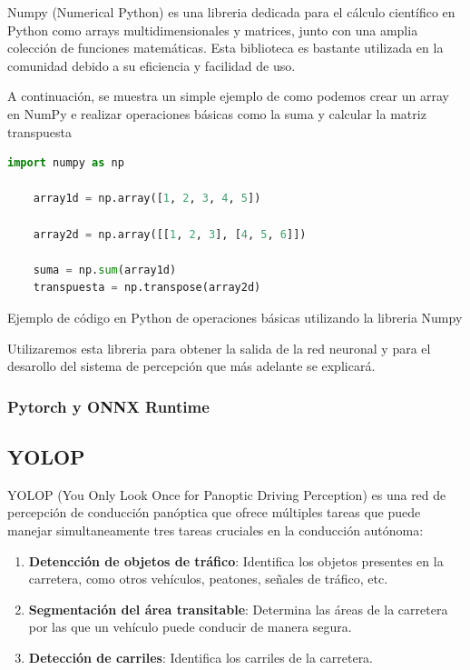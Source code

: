 Numpy (Numerical Python) es una libreria dedicada para el cálculo científico en Python como arrays multidimensionales y matrices, junto con una amplia
colección de funciones matemáticas. Esta biblioteca es bastante utilizada en la comunidad debido a su eficiencia y facilidad de uso. 

A continuación, se muestra un simple ejemplo de como podemos crear un array en NumPy e realizar operaciones básicas como la suma y calcular la matriz transpuesta

\begin{code}[h]
  \begin{lstlisting}[language=Python]
    import numpy as np

    array1d = np.array([1, 2, 3, 4, 5])

    array2d = np.array([[1, 2, 3], [4, 5, 6]])

    suma = np.sum(array1d)  
    transpuesta = np.transpose(array2d)  
  \end{lstlisting}
  \caption[Ejemplo de código en Python de operaciones básicas utilizando la libreria Numpy]{Ejemplo de código en Python de operaciones básicas utilizando la libreria Numpy}
  \label{cod:Numpy}
  \end{code}  

Utilizaremos esta libreria para obtener la salida de la red neuronal y para el desarollo del sistema de percepción que más adelante se explicará. 

\subsubsection{Pytorch y ONNX Runtime}
\label{sec:pytorchandonnx}
\newpage
\subsection{YOLOP}
\label{sec:YOLOP}
YOLOP (You Only Look Once for Panoptic Driving Perception) es una red de percepción
de conducción panóptica que ofrece múltiples tareas que puede
manejar simultaneamente tres tareas cruciales en la conducción autónoma: 
\begin{enumerate}
  \item \textbf{Detencción de objetos de tráfico}: Identifica los objetos presentes en la carretera, como otros vehículos, peatones, señales de tráfico, etc.
  \item \textbf{Segmentación del área transitable}: Determina las áreas de la carretera por las que un vehículo puede conducir de manera segura.
  \item \textbf{Detección de carriles}: Identifica los carriles de la carretera.
\end{enumerate}

